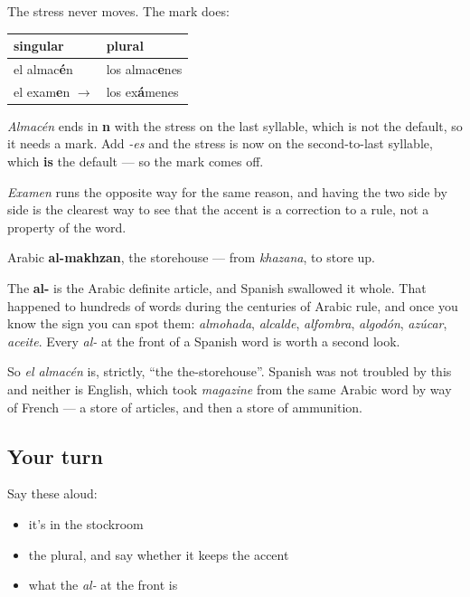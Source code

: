 \begin{grammarlens}[title={Grammar Lens: the accent that comes and goes}]
The stress never moves. The mark does:

\noindent
\begin{tabularx}{\linewidth}{@{}>{\raggedright\arraybackslash}X>{\raggedright\arraybackslash}X@{}}
\toprule
\textbf{singular} & \textbf{plural} \\
\midrule
el almac\textbf{é}n & los almac\textbf{e}nes \\
el exam\textbf{e}n $\to$ & los ex\textbf{á}menes \\
\bottomrule
\end{tabularx}

\emph{Almacén} ends in \textbf{n} with the stress on the last syllable, which is not the default, so it needs a mark. Add \emph{-es} and the stress is now on the second-to-last syllable, which \textbf{is} the default — so the mark comes off.

\emph{Examen} runs the opposite way for the same reason, and having the two side by side is the clearest way to see that the accent is a correction to a rule, not a property of the word.
\end{grammarlens}

\begin{cousinweb}
Arabic \textbf{al-makhzan}, the storehouse — from \emph{khazana}, to store up.

The \textbf{al-} is the Arabic definite article, and Spanish swallowed it whole. That happened to hundreds of words during the centuries of Arabic rule, and once you know the sign you can spot them: \emph{almohada}, \emph{alcalde}, \emph{alfombra}, \emph{algodón}, \emph{azúcar}, \emph{aceite}. Every \emph{al-} at the front of a Spanish word is worth a second look.

So \emph{el almacén} is, strictly, \textquotedblleft{}the the-storehouse\textquotedblright{}. Spanish was not troubled by this and neither is English, which took \emph{magazine} from the same Arabic word by way of French — a store of articles, and then a store of ammunition.
\end{cousinweb}

\subsection*{Your turn}
Say these aloud:

\begin{itemize}
\raggedright
  \item it's in the stockroom
  \item the plural, and say whether it keeps the accent
  \item what the \emph{al-} at the front is
\end{itemize}

